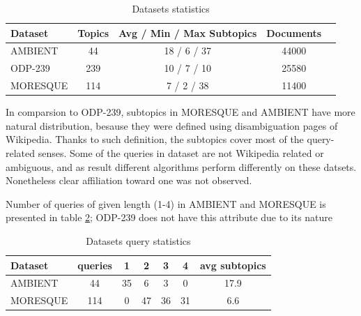 \documentclass[a4paper, 12pt, oneside]{Thesis} %
\begin{document}
\begin{table}[th]
\centering
 \begin{tabular}{| l | c | c | c | c | }
 \hline
 Dataset & Topics & Avg / Min / Max Subtopics & Documents  \\ \hline
 AMBIENT & 44 & 18 / 6 / 37 & 44000 \\ \hline
 ODP-239 & 239 & 10 / 7 / 10 & 25580 \\ \hline
 MORESQUE & 114 & 7 / 2 / 38 & 11400 \\ \hline
 \end{tabular}
\caption{Datasets statistics}
\label{tab:datasetsinfo}
\end{table}

In comparsion to ODP-239, subtopics in MORESQUE and AMBIENT have more natural distribution, besause they were defined using disambiguation pages of Wikipedia. Thanks to such definition, the subtopics cover most of the query-related senses. Some of the queries in dataset are not Wikipedia related or ambiguous, and as result different algorithms perform differently on these datsets. Nonetheless clear affiliation toward one was not observed.

Number of queries of given length (1-4) in AMBIENT and MORESQUE is presented in table \ref{tab:amnumbers}; ODP-239 does not have this attribute due to its nature

\begin{table}[th]
\centering
 \begin{tabular}{| l | c | c | c | c | c | c | }
 \hline
 Dataset & queries & 1 & 2 & 3 & 4 & avg subtopics \\ \hline
 AMBIENT & 44 & 35 & 6 & 3 & 0 & 17.9 \\ \hline
 MORESQUE & 114 & 0 & 47 & 36 & 31 & 6.6 \\ \hline
 \end{tabular}
\caption{Datasets query statistics}
\label{tab:amnumbers}
\end{table}
\end{document}
